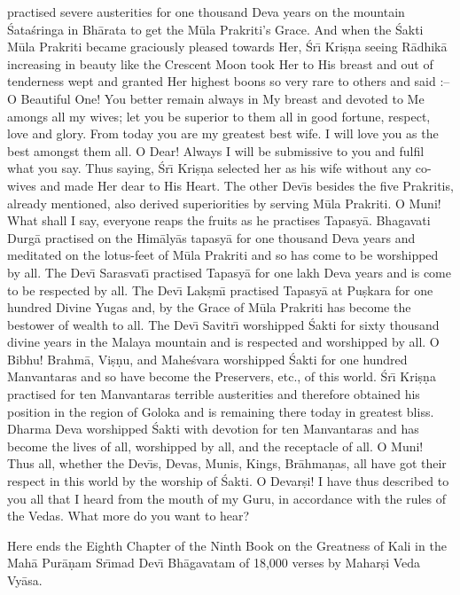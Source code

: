 practised severe austerities for one thousand Deva years on the mountain \'Sata\'sringa in Bh\=arata to get the M\=ula Prakriti's Grace. And when the \'Sakti M\=ula Prakriti became graciously pleased towards Her, \'Sr\={\i} Kri\d{s}\d{n}a seeing R\=adhik\=a increasing in beauty like the Crescent Moon took Her to His breast and out of tenderness wept and granted Her highest boons so very rare to others and said :-- O Beautiful One! You better remain always in My breast and devoted to Me amongs all my wives; let you be superior to them all in good fortune, respect, love and glory. From today you are my greatest best wife. I will love you as the best amongst them all. O Dear! Always I will be submissive to you and fulfil what you say. Thus saying, \'Sr\={\i} Kri\d{s}\d{n}a selected her as his wife without any co-wives and made Her dear to His Heart. The other Dev\={\i}s besides the five Prakritis, already mentioned, also derived superiorities by serving M\=ula Prakriti. O Muni! What shall I say, everyone reaps the fruits as he practises Tapasy\=a. Bhagavati Durg\=a practised on the Him\=aly\=as tapasy\=a for one thousand Deva years and meditated on the lotus-feet of M\=ula Prakriti and so has come to be worshipped by all. The Dev\={\i} Sarasvat\={\i} practised Tapasy\=a for one lakh Deva years and is come to be respected by all. The Dev\={\i} Lak\d{s}m\={\i} practised Tapasy\=a at Pu\d{s}kara for one hundred Divine Yugas and, by the Grace of M\=ula Prakriti has become the bestower of wealth to all. The Dev\={\i} Savitr\={\i} worshipped \'Sakti for sixty thousand divine years in the Malaya mountain and is respected and worshipped by all. O Bibhu! Brahm\=a, Vi\d{s}\d{n}u, and Mahe\'svara worshipped \'Sakti for one hundred Manvantaras and so have become the Preservers, etc., of this world. \'Sr\={\i} Kri\d{s}\d{n}a practised for ten Manvantaras terrible austerities and therefore obtained his position in the region of Goloka and is remaining there today in greatest bliss. Dharma Deva worshipped \'Sakti with devotion for ten Manvantaras and has become the lives of all, worshipped by all, and the receptacle of all. O Muni! Thus all, whether the Dev\={\i}s, Devas, Munis, Kings, Br\=ahma\d{n}as, all have got their respect in this world by the worship of \'Sakti. O Devar\d{s}i! I have thus described to you all that I heard from the mouth of my Guru, in accordance with the rules of the Vedas. What more do you want to hear?

Here ends the Eighth Chapter of the Ninth Book on the Greatness of Kali in the Mah\=a Pur\=a\d{n}am Sr\={\i}mad Dev\={\i} Bh\=agavatam of 18,000 verses by Mahar\d{s}i Veda Vy\=asa.



